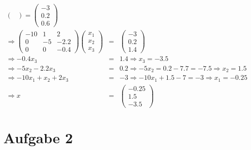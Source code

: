 \documentclass[11pt]{article} %
\begin{document}
\begin{enumerate}[a)]
\begin{eqnarray*}
\begin{pmatrix}
\end{pmatrix} = \begin{pmatrix} -3 \\ 0.2 \\ 0.6 \end{pmatrix} \\
\Rightarrow   \begin{pmatrix}  -10 & 1 & 2 \\ 0 & -5 & -2.2 \\ 0 & 0 &  -0.4 \end{pmatrix} \begin{pmatrix} x_1 \\ x_2 \\ x_3 \end{pmatrix} &=& \begin{pmatrix} -3 \\ 0.2 \\ 1.4 \end{pmatrix} \\
\Rightarrow -0.4x_3 &=& 1.4 \Rightarrow x_3 = -3.5 \\
\Rightarrow -5x_2 -2.2x_3 &=& 0.2 \Rightarrow -5x_2 = 0.2 - 7.7 = -7.5 \Rightarrow x_2 = 1.5 \\
\Rightarrow -10x_1 + x_2 + 2x_3 &=& -3 \Rightarrow -10x_1 + 1.5 -7 = -3 \Rightarrow x_1 = -0.25 \\
\Rightarrow x &=& \begin{pmatrix} -0.25 \\ 1.5 \\ -3.5 \end{pmatrix}
\end{eqnarray*}

\end{enumerate}

\section*{Aufgabe 2}
\end{document}
